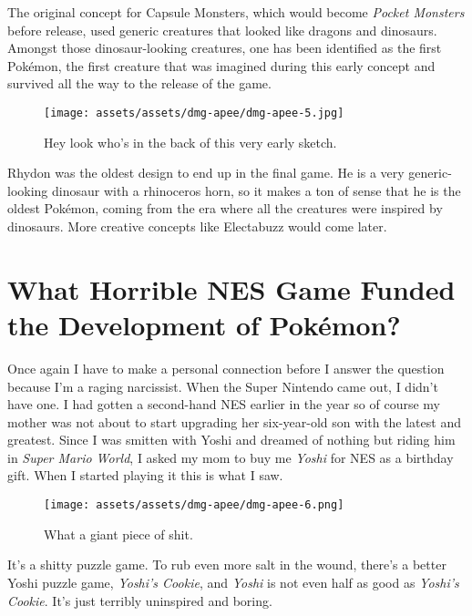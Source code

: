\documentclass{book}
\begin{document}
The original concept for Capsule Monsters, which would become \emph{Pocket Monsters} before release, used generic creatures that looked like dragons and dinosaurs. Amongst those dinosaur-looking creatures, one has been identified as the first Pokémon, the first creature that was imagined during this early concept and survived all the way to the release of the game.

\begin{figure}[hbt]
\vskip 10pt
\centering \texttt{[image: assets/assets/dmg-apee/dmg-apee-5.jpg]}\par\pagetwodescription Hey look who’s in the back of this very early sketch.
\vskip 6pt
\end{figure}

Rhydon was the oldest design to end up in the final game. He is a very generic-looking dinosaur with a rhinoceros horn, so it makes a ton of sense that he is the oldest Pokémon, coming from the era where all the creatures were inspired by dinosaurs. More creative concepts like Electabuzz would come later.

\FloatBarrier\needspace{5pt}\section*{What Horrible NES Game Funded the Development of Pokémon?}\nopagebreak[4]

Once again I have to make a personal connection before I answer the question because I’m a raging narcissist. When the Super Nintendo came out, I didn’t have one. I had gotten a second-hand NES earlier in the year so of course my mother was not about to start upgrading her six-year-old son with the latest and greatest. Since I was smitten with Yoshi and dreamed of nothing but riding him in \emph{Super Mario World}, I asked my mom to buy me \emph{Yoshi} for NES as a birthday gift. When I started playing it this is what I saw.

\begin{figure}[hbt]
\vskip 10pt
\centering \texttt{[image: assets/assets/dmg-apee/dmg-apee-6.png]}\par\pagetwodescription What a giant piece of shit.
\vskip 6pt
\end{figure}

It’s a shitty puzzle game. To rub even more salt in the wound, there’s a better Yoshi puzzle game, \emph{Yoshi’s Cookie}, and \emph{Yoshi} is not even half as good as \emph{Yoshi’s Cookie}. It’s just terribly uninspired and boring.
\end{document}
